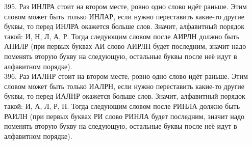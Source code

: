 395. Раз ИНЛРА стоит на втором месте, ровно одно слово идёт раньше. Этим словом может быть только ИНЛАР, если нужно переставить какие-то другие буквы, то перед ИНЛРА окажется больше слов. Значит, алфавитный порядок такой: И, Н, Л, А, Р. Тогда следующим словом после АИРЛН должно быть АНИЛР (при первых буквах АИ слово АИРЛН будет последним, значит надо поменять вторую букву на следующую, остальные буквы после неё идут в алфавитном порядке).\\
396. Раз ИАЛНР стоит на втором месте, ровно одно слово идёт раньше. Этим словом может быть только ИАЛРН, если нужно переставить какие-то другие буквы, то перед ИАЛНР окажется больше слов. Значит, алфавитный порядок такой: И, А, Л, Р, Н. Тогда следующим словом после РИНЛА должно быть РАИЛН (при первых буквах РИ слово РИНЛА будет последним, значит надо поменять вторую букву на следующую, остальные буквы после неё идут в алфавитном порядке).
 